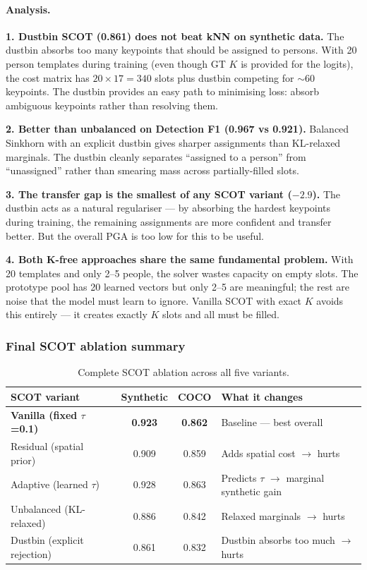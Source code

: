 \paragraph{Analysis.}

\textbf{1. Dustbin SCOT (0.861) does not beat kNN on synthetic data.} The dustbin absorbs too many keypoints that should be assigned to persons. With 20 person templates during training (even though GT $K$ is provided for the logits), the cost matrix has $20 \times 17 = 340$ slots plus dustbin competing for $\sim$60 keypoints. The dustbin provides an easy path to minimising loss: absorb ambiguous keypoints rather than resolving them.

\textbf{2. Better than unbalanced on Detection F1 (0.967 vs 0.921).} Balanced Sinkhorn with an explicit dustbin gives sharper assignments than KL-relaxed marginals. The dustbin cleanly separates ``assigned to a person'' from ``unassigned'' rather than smearing mass across partially-filled slots.

\textbf{3. The transfer gap is the smallest of any SCOT variant ($-2.9$).} The dustbin acts as a natural regulariser --- by absorbing the hardest keypoints during training, the remaining assignments are more confident and transfer better. But the overall PGA is too low for this to be useful.

\textbf{4. Both K-free approaches share the same fundamental problem.} With 20 templates and only 2--5 people, the solver wastes capacity on empty slots. The prototype pool has 20 learned vectors but only 2--5 are meaningful; the rest are noise that the model must learn to ignore. Vanilla SCOT with exact $K$ avoids this entirely --- it creates exactly $K$ slots and all must be filled.


\subsubsection{Final SCOT ablation summary}

\begin{table}[H]
\centering
\footnotesize
\begin{tabular}{lccl}
\toprule
SCOT variant & Synthetic & COCO & What it changes \\
\midrule
\textbf{Vanilla (fixed $\tau$=0.1)} & \textbf{0.923} & \textbf{0.862} & Baseline --- best overall \\
Residual (spatial prior) & 0.909 & 0.859 & Adds spatial cost $\to$ hurts \\
Adaptive (learned $\tau$) & 0.928 & 0.863 & Predicts $\tau$ $\to$ marginal synthetic gain \\
Unbalanced (KL-relaxed) & 0.886 & 0.842 & Relaxed marginals $\to$ hurts \\
Dustbin (explicit rejection) & 0.861 & 0.832 & Dustbin absorbs too much $\to$ hurts \\
\bottomrule
\end{tabular}
\caption{Complete SCOT ablation across all five variants.}
\end{table}

